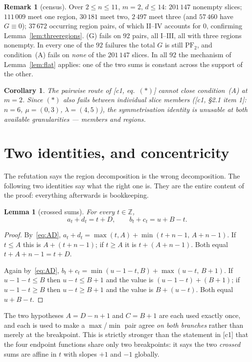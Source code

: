 \documentclass[11pt]{article}
\newtheorem{lemma}[theorem]{Lemma}
\newtheorem{corollary}[theorem]{Corollary}
\theoremstyle{definition}
\newtheorem{remark}[theorem]{Remark}
\newcommand{\Z}{\mathbb Z}
\newcommand{\PFtwo}{\mathrm{PF}_2}
\begin{document}
\begin{remark}[census]\label{rem:census}
Over $2\le n\le11$, $m=2$, $d\le14$: $201\,147$ nonempty slices; $111\,009$ meet one region,
$30\,181$ meet two, $2\,497$ meet three (and $57\,460$ have $G\equiv0$); $37\,672$ occurring
region pairs, of which $\mathrm{II}$--$\mathrm{IV}$ accounts for $0$, confirming
Lemma~\ref{lem:threeregions}. (G) fails on $92$ pairs, all $\mathrm I$--$\mathrm{III}$, all
with three regions nonempty. In every one of the $92$ failures the total $G$ is still
$\PFtwo$, and condition~(A) fails on \emph{none} of the $201\,147$ slices. In all $92$ the
mechanism of Lemma~\ref{lem:flat} applies: one of the two sums is constant across the
support of the other.
\end{remark}

\begin{corollary}
The pairwise route of \textup{[c1, eq.~$(*)$]} cannot close condition~(A) at $m=2$.
Since $(*)$ also fails between individual slice members
\textup{([c1, §2.1 item 1]: $n=6$, $\mu=(0,3)$, $\lambda=(4,5)$)}, the symmetrisation
identity is unusable at \emph{both} available granularities --- members and regions.
\end{corollary}

\section{Two identities, and concentricity}\label{sec:conc}

The refutation says the region decomposition is the wrong decomposition. The following two
identities say what the right one is. They are the entire content of the proof: everything
afterwards is bookkeeping.

\begin{lemma}[crossed sums]\label{lem:crossed}
For every $t\in\Z$,
\[
  a_t+d_t=t+D,\qquad b_t+c_t=u+B-t .
\]
\end{lemma}
\begin{proof}
By~\eqref{eq:AD}, $a_t+d_t=\max(t,A)+\min(t+n-1,\,A+n-1)$. If $t\le A$ this is
$A+(t+n-1)$; if $t\ge A$ it is $t+(A+n-1)$. Both equal $t+A+n-1=t+D$.

Again by~\eqref{eq:AD}, $b_t+c_t=\min(u-1-t,B)+\max(u-t,\,B+1)$. If $u-1-t\le B$ then
$u-t\le B+1$ and the value is $(u-1-t)+(B+1)$; if $u-1-t\ge B$ then $u-t\ge B+1$ and the
value is $B+(u-t)$. Both equal $u+B-t$.
\end{proof}

The two hypotheses $A=D-n+1$ and $C=B+1$ are each used exactly once, and each is used to
make a $\max$/$\min$ pair agree \emph{on both branches} rather than merely at the
breakpoint. This is strictly stronger than the statement in [c1] that the four endpoint
functions share only two breakpoints: it says the two \emph{crossed} sums are affine in $t$
with slopes $+1$ and $-1$ globally.
\end{document}
